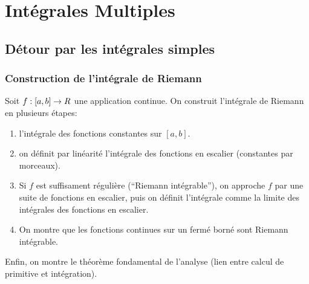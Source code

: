 \chapter{Intégrales Multiples}

\sld{\vfill\pagebreak[5]}%

\section{Détour par les intégrales simples}

\subsection{Construction de l'intégrale de Riemann}

Soit $f:[a,b] \to R$ une application continue. On construit l'intégrale de Riemann en plusieurs étapes:
\begin{enumerate}
	\item l'intégrale des fonctions constantes sur $[a,b]$. 
		\pl{\rep{3cm}}
	\item on définit par linéarité l'intégrale des fonctions en escalier (constantes par morceaux).
		\pl{\rep{3cm}}
	\item Si $f$ est suffisament régulière (``Riemann intégrable''), on approche $f$ par une suite de fonctions en escalier, puis on définit l'intégrale comme la limite des intégrales des fonctions en escalier. 
		\pl{\rep{3cm}}
	\item On montre que les fonctions continues sur un fermé borné sont Riemann intégrable.
       \end{enumerate}
               \begin{center}
               \tikzexternalenable {}
               \tikzexternaldisable
               \end{center}
Enfin, on montre le théorème fondamental de l'analyse (lien entre calcul de primitive et intégration).

